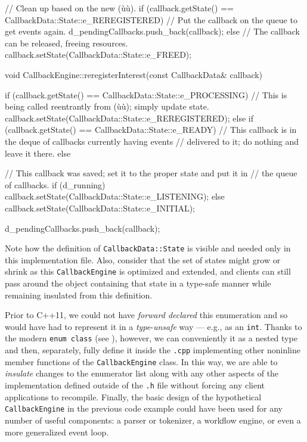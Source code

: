 \begin{emcppslisting}[emcppsbatch=e6]
{{{            // Clean up based on the new (ù{}ù).
            if (callback.getState() == CallbackData::State::e_REREGISTERED)
            {
                // Put the callback on the queue to get events again.
                d_pendingCallbacks.push_back(callback);
            }
            else
            {
                // The callback can be released, freeing resources.
                callback.setState(CallbackData::State::e_FREED);
            }
        }
    }
}

void CallbackEngine::reregisterInterest(const CallbackData& callback)
{
    if (callback.getState() == CallbackData::State::e_PROCESSING)
    {
        // This is being called reentrantly from (ù{}ù); simply update state.
        callback.setState(CallbackData::State::e_REREGISTERED);
    }
    else if (callback.getState() == CallbackData::State::e_READY)
    {
        // This callback is in the deque of callbacks currently having events
        // delivered to it; do nothing and leave it there.
    }
    else
    {
        // This callback was saved; set it to the proper state and put it in
        // the queue of callbacks.
        if (d_running)
        {
            callback.setState(CallbackData::State::e_LISTENING);
        }
        else
        {
            callback.setState(CallbackData::State::e_INITIAL);
        }

        d_pendingCallbacks.push_back(callback);
    }
}

\end{emcppslisting}

\noindent Note how the definition of \lstinline!CallbackData::State! is visible and
needed only in this implementation file. Also, consider that the set of
states might grow or shrink as this \lstinline!CallbackEngine! is optimized
and extended, and clients can still pass around the object containing
that state in a type-safe manner while remaining insulated from this
definition.

Prior to C++11, we could not have \emph{forward declared} this
enumeration and so would have had to represent it in a
\emph{type}-\emph{unsafe} way --- e.g., as an \lstinline!int!. Thanks to
the modern \lstinline!enum!~\lstinline!class! (see ), however, we can
conveniently  it as a nested type and then,
separately, fully define it inside the \lstinline!.cpp! implementing other
noninline member functions of the \lstinline!CallbackEngine! class. In
this way, we are able to \emph{insulate} changes to the enumerator list
along with any other aspects of the implementation defined outside of
the \lstinline!.h! file without forcing any client applications to
recompile. Finally, the basic design of the hypothetical \lstinline!CallbackEngine!
in the previous code example could have been used for any number of
useful components: a parser or tokenizer, a workflow engine, or even a
more generalized event loop.


